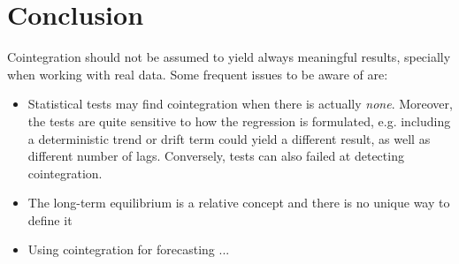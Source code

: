 \documentclass[11pt]{article}
\providecommand{\tightlist}{%
      \setlength{\itemsep}{0pt}\setlength{\parskip}{0pt}}
\begin{document}
    \begin{figure}[!ht] 
        \begin{center}
    \end{center}
    \caption{} \label{figpnl}
    \end{figure}


\newpage
    
        \section{Conclusion}\label{conclusion}
    
   Cointegration should not be assumed to yield always meaningful results, specially when working with real data. Some frequent issues to be aware of are:
   
      
\begin{itemize}
\tightlist
\item Statistical tests may find cointegration when there is actually {\em none}. Moreover, the tests are quite sensitive to how the  regression  is formulated, e.g. including a deterministic trend or drift term could yield a different result, as well as different number of lags. Conversely, tests can also failed at detecting cointegration.
\item The long-term equilibrium is a relative concept and there is no unique way to define it
\item Using cointegration for forecasting ...
\end{itemize}


    
\newpage
\end{document}
